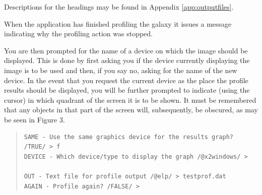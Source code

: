 \documentclass[twoside,11pt]{article}
\newenvironment{myquote}{\begin{quote}\begin{small}}{\end{small}\end{quote}}
\begin{document}
Descriptions for the headings may be found in Appendix \ref{app:outputfiles}.

When the application has finished profiling the galaxy it issues a message
indicating why the profiling action was stopped.

You are then prompted for the name of a device on which the image should be
displayed. This is done by first asking you if the device currently displaying
the image is to be used
and then, if you say no, asking for the name of the new device. In the event
that you request the current device as the place the profile results should be
displayed, you will be further prompted to indicate (using the cursor) in which
quadrant of the
screen it is to be shown. It must be remembered that any objects in that part
of the screen will, subsequently, be obscured, as may be seen in Figure 3.

\begin{myquote}
\begin{verbatim}
SAME - Use the same graphics device for the results graph? /TRUE/ > f
DEVICE - Which device/type to display the graph /@x2windows/ > 
 
OUT - Text file for profile output /@elp/ > testprof.dat
AGAIN - Profile again? /FALSE/ > 
\end{verbatim}
\end{myquote}
\end{document}
